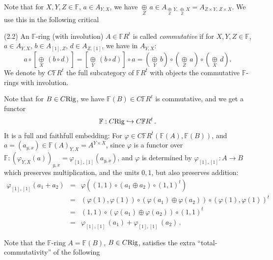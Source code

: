 \documentclass[leqno]{article}
\numberwithin{equation}{section}
\begin{document}
\smallskip

Note that for $X,Y,Z \in {\mathbb F}$, $a \in A_{Y,X}$, we have $\underset{Z}{\oplus} \, a \in A_{\underset{Z}{\oplus} \, Y , \, \underset{Z}{\oplus} \, X} = A_{Z \times Y , \, Z \times X}$. We use this in the following critical

\bigskip

\noindent (2.2)  An ${\mathbb F}$-ring (with involution) $A \in {\mathbb F} R^t$ is called {\it commutative} if for $X,Y,Z \in {\mathbb F}$, $a \in A_{Y,X}$, $b \in A_{[1], Z}$, $d \in A_{Z,[1]}$, we have in $A_{Y,X}$:
$$
a \circ \left[ \underset{X}{\oplus} \, (b \circ d) \right] = \left[ \underset{Y}{\oplus} \, (b \circ d) \right] \circ a = \left( \underset{Y}{\oplus} \, b \right) \circ \left( \underset{Z}{\oplus} \, a \right) \circ \left( \underset{X}{\oplus} \, d \right) .
$$
We denote by $C{\mathbb F} R^t$ the full subcategory of ${\mathbb F} R^t$ with objects  the commutative ${\mathbb F}$-rings with involution.

\smallskip

Note that for $B \in C{\rm Rig}$, we have ${\mathbb F} (B) \in C{\mathbb F} R^t$ is commutative, and we get a functor
$$
{\mathbb F} : C{\rm Rig} \hookrightarrow C{\mathbb F} R^t \, .
$$
It is a full and faithfull embedding: For $\varphi \in C{\mathbb F} R^t ({\mathbb F} (A) , {\mathbb F}(B))$, and $a = (a_{y,x}) \in {\mathbb F} (A)_{Y,X} = A^{Y \times X}$, since $\varphi$ is a functor over ${\mathbb F} : (\varphi_{Y,X} (a))_{y,x} = \varphi_{[1],[1]} (a_{y,x})$, and $\varphi$ is determined by $\varphi_{[1],[1]} : A \to B$ which preserves multiplication, and the units $0,1$, but also preserves addition:
\setcounter{equation}{2}
\begin{eqnarray}
\varphi_{[1],[1]} (a_1 + a_2) &= &\varphi \left( (1,1) \circ (a_1 \oplus a_2) \circ (1,1)^t \right) \\
&= &(\varphi (1) , \varphi (1)) \circ \left( \varphi (a_1) \oplus \varphi (a_2) \right) \circ (\varphi (1) , \varphi (1))^t  \nonumber \\
&= &(1,1) \circ \left( \varphi (a_1) \oplus \varphi (a_2) \right) \circ (1,1)^t \nonumber \\
&= &\varphi_{[1],[1]} \, (a_1) + \varphi_{[1],[1]} \, (a_2) \, . \nonumber
\end{eqnarray}

Note that the ${\mathbb F}$-ring $A = {\mathbb F} (B)$, $B \in C{\rm Rig}$, satisfies the extra ``total-commutativity'' of the following
\end{document}

